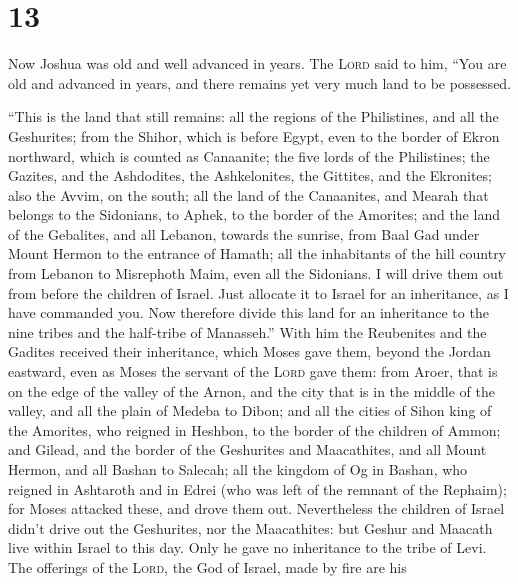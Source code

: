 \hypertarget{section-12}{%
\section{13}\label{section-12}}

 Now Joshua was old and well advanced in years. The
\textsc{Lord} said to him, ``You are old and advanced in years, and
there remains yet very much land to be possessed.

 ``This is the land that still remains: all the regions of
the Philistines, and all the Geshurites;  from the Shihor,
which is before Egypt, even to the border of Ekron northward, which is
counted as Canaanite; the five lords of the Philistines; the Gazites,
and the Ashdodites, the Ashkelonites, the Gittites, and the Ekronites;
also the Avvim,  on the south; all the land of the
Canaanites, and Mearah that belongs to the Sidonians, to Aphek, to the
border of the Amorites;  and the land of the Gebalites,
and all Lebanon, towards the sunrise, from Baal Gad under Mount Hermon
to the entrance of Hamath;  all the inhabitants of the
hill country from Lebanon to Misrephoth Maim, even all the Sidonians. I
will drive them out from before the children of Israel. Just allocate it
to Israel for an inheritance, as I have commanded you. 
Now therefore divide this land for an inheritance to the nine tribes and
the half-tribe of Manasseh.''  With him the Reubenites and
the Gadites received their inheritance, which Moses gave them, beyond
the Jordan eastward, even as Moses the servant of the \textsc{Lord} gave
them:  from Aroer, that is on the edge of the valley of
the Arnon, and the city that is in the middle of the valley, and all the
plain of Medeba to Dibon;  and all the cities of Sihon
king of the Amorites, who reigned in Heshbon, to the border of the
children of Ammon;  and Gilead, and the border of the
Geshurites and Maacathites, and all Mount Hermon, and all Bashan to
Salecah;  all the kingdom of Og in Bashan, who reigned in
Ashtaroth and in Edrei (who was left of the remnant of the Rephaim); for
Moses attacked these, and drove them out.  Nevertheless
the children of Israel didn't drive out the Geshurites, nor the
Maacathites: but Geshur and Maacath live within Israel to this day.
 Only he gave no inheritance to the tribe of Levi. The
offerings of the \textsc{Lord}, the God of Israel, made by fire are his
